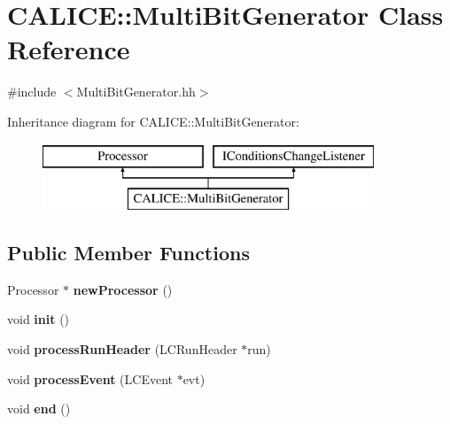 \section{C\-A\-L\-I\-C\-E\-:\-:Multi\-Bit\-Generator Class Reference}
\label{classCALICE_1_1MultiBitGenerator}


{\ttfamily \#include $<$Multi\-Bit\-Generator.\-hh$>$}

Inheritance diagram for C\-A\-L\-I\-C\-E\-:\-:Multi\-Bit\-Generator\-:\begin{figure}[H]
\begin{center}
\leavevmode
\includegraphics[height=2.000000cm]{classCALICE_1_1MultiBitGenerator}
\end{center}
\end{figure}
\subsection*{Public Member Functions}
\begin{DoxyCompactItemize}
\item 
Processor $\ast$ {\bfseries new\-Processor} ()\label{classCALICE_1_1MultiBitGenerator_a080c30da572966739180c5ad78b33726}

\item 
void {\bf init} ()
\item 
void {\bf process\-Run\-Header} (L\-C\-Run\-Header $\ast$run)
\item 
void {\bf process\-Event} (L\-C\-Event $\ast$evt)
\item 
void {\bfseries end} ()\label{classCALICE_1_1MultiBitGenerator_a9c66f8fc52d55b6185ee98d5d63b5b95}

\end{DoxyCompactItemize}
